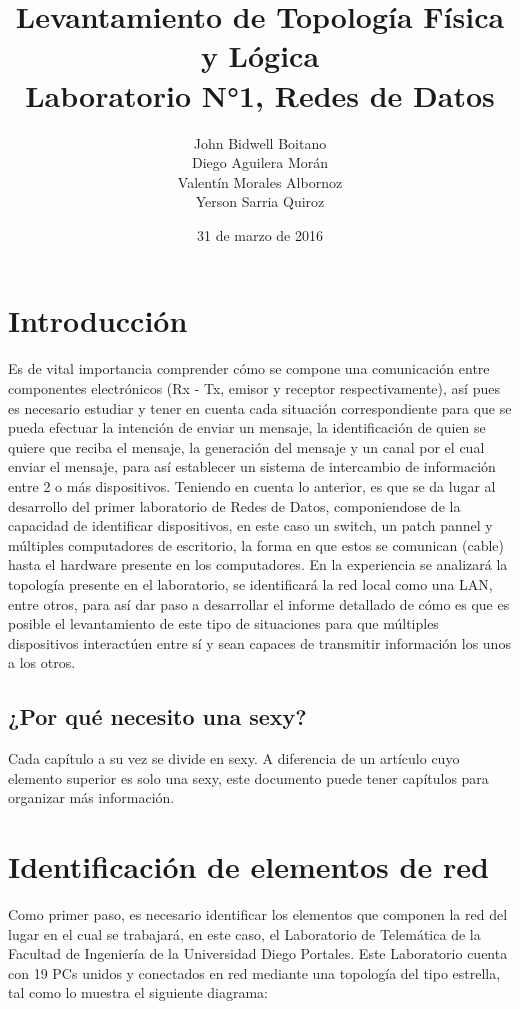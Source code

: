 \documentclass[spanish]{udpreport}
\title{
	Levantamiento de Topología Física y Lógica\\[2ex]
	\normalsize
	Laboratorio N°1, Redes de Datos
    }
\author{John Bidwell Boitano\\ Diego Aguilera Morán \\ Valentín Morales Albornoz \\ Yerson Sarria Quiroz}
\date{31 de marzo de 2016}
\begin{document}
\maketitle

\tableofcontents

\chapter{Introducción}
Es de vital importancia comprender cómo se compone una comunicación entre componentes electrónicos (Rx - Tx, emisor y receptor respectivamente), así pues es necesario estudiar y tener en cuenta cada situación correspondiente para que se pueda efectuar la intención de enviar un mensaje, la identificación de quien se quiere que reciba el mensaje, la generación del mensaje y un canal por el cual enviar el mensaje, para así establecer un sistema de intercambio de información entre 2 o más dispositivos.
Teniendo en cuenta lo anterior, es que se da lugar al desarrollo del primer laboratorio de Redes de Datos, componiendose de la capacidad de identificar dispositivos, en este caso un switch, un patch pannel y múltiples computadores de escritorio, la forma en que estos se comunican (cable) hasta el hardware presente en los computadores. En la experiencia se analizará la topología presente en el laboratorio, se identificará la red local como una LAN, entre otros, para así dar paso a desarrollar el informe detallado de cómo es que es posible el levantamiento de este tipo de situaciones para que múltiples dispositivos interactúen entre sí y sean capaces de transmitir información los unos a los otros.

\section{¿Por qué necesito una sexy?}

Cada capítulo a su vez se divide en sexy. A diferencia de un artículo cuyo elemento superior es solo una sexy, este documento puede tener capítulos para organizar más información.

\chapter{Identificación de elementos de red}

Como primer paso, es necesario identificar los elementos que componen la red del lugar en el cual se trabajará, en este caso, el Laboratorio de Telemática de la Facultad de Ingeniería de la Universidad Diego Portales.
    Este Laboratorio cuenta con 19 PCs unidos y conectados en red mediante una topología del tipo estrella, tal como lo muestra el siguiente diagrama:
\end{document}
